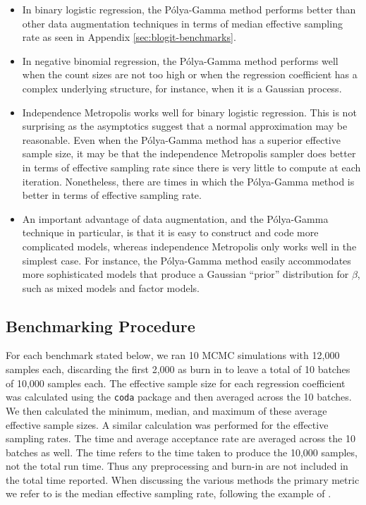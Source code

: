 \documentclass{article}
\newcommand{\Polya}{P\'{o}lya}
\begin{document}
\begin{itemize}

\item In binary logistic regression, the \Polya-Gamma method performs better
  than other data augmentation techniques in terms of median effective sampling
  rate as seen in Appendix \ref{sec:blogit-benchmarks}.

\item In negative binomial regression, the \Polya-Gamma method performs well
  when the count sizes are not too high or when the regression coefficient has a
  complex underlying structure, for instance, when it is a Gaussian process.

\item Independence Metropolis works well for binary logistic regression.  This
  is not surprising as the asymptotics suggest that a normal approximation may
  be reasonable.  Even when the \Polya-Gamma method has a superior effective
  sample size, it may be that the independence Metropolis sampler does better in
  terms of effective sampling rate since there is very little to compute at each
  iteration.  Nonetheless, there are times in which the \Polya-Gamma method is
  better in terms of effective sampling rate.

\item An important advantage of data augmentation, and the \Polya-Gamma
  technique in particular, is that it is easy to construct and code more
  complicated models, whereas independence Metropolis only works well in the
  simplest case.  For instance, the \Polya-Gamma method easily accommodates more
  sophisticated models that produce a Gaussian ``prior'' distribution for
  $\beta$, such as mixed models and factor models.

\end{itemize}

\subsection{Benchmarking Procedure}

For each benchmark stated below, we ran 10 MCMC simulations with 12,000 samples
each, discarding the first 2,000 as burn in to leave a total of 10 batches of
10,000 samples each.  The effective sample size for each regression coefficient
was calculated using the \texttt{coda} package and then averaged across the 10
batches.  We then calculated the minimum, median, and maximum of these average
effective sample sizes.  A similar calculation was performed for the effective
sampling rates.  The time and average acceptance rate are averaged across the 10
batches as well.  The time refers to the time taken to produce the 10,000
samples, not the total run time.  Thus any preprocessing and burn-in are not
included in the total time reported.  When discussing the various methods the
primary metric we refer to is the median effective sampling rate, following the
example of \cite{fruhwirth-schnatter-fruhwirth-2010}.  
\end{document}

